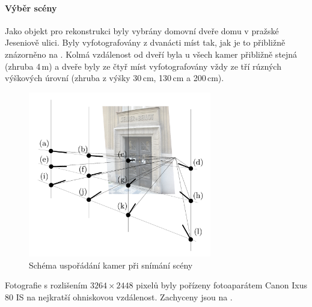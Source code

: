 \documentclass[11pt,oneside,a4paper,pdftex]{article}   %
\begin{document}
\paragraph{Výběr scény}
Jako objekt pro rekonstrukci byly vybrány domovní dveře domu v pražské Jeseniově ulici. Byly
vyfotografovány z dvanácti míst tak, jak je to přibližně znázorněno na .
Kolmá vzdálenost od dveří byla u všech kamer přibližně stejná (zhruba 4\,m) a dveře byly ze čtyř
míst vyfotografovány vždy ze tří rúzných výškových úrovní (zhruba z výšky 30\,cm, 130\,cm a
200\,cm).
	\begin{figure}[h]
		\centering
		\includegraphics[width=8cm]{pictures/usporadani_kamer.pdf}
		\caption{Schéma uspořádání kamer při snímání scény}
		\label{fig:usporadaniKamer}
	\end{figure}
Fotografie s rozlišením $3264\times2448$ pixelů byly pořízeny fotoaparátem Canon Ixus 80
IS na nejkratší ohniskovou vzdálenost. Zachyceny jsou na .
\end{document}
